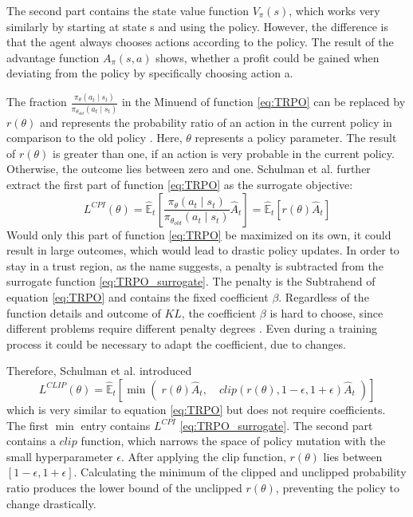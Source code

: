 The second part contains the state value function $V_\pi(s)$, which works very similarly by starting at state s and using the policy. However, the difference is that the agent always chooses actions according to the policy. The result of the advantage function $A_\pi(s,a)$ shows, whether a profit could be gained when deviating from the policy by specifically choosing action a.

The fraction $\frac{\pi_{\theta}(a_{t} \mid s_{t})}{\pi_{\theta_{old}}(a_{t} \mid s_{t})}$ in the Minuend of function \eqref{eq:TRPO} can be replaced by $r(\theta)$
and represents the probability ratio of an action in the current policy in comparison to the old policy \cite{scwo17}. Here, $\theta$ represents a policy parameter. The result of $r(\theta)$ is greater than one, if an action is very probable in the current policy. Otherwise, the outcome lies between zero and one. Schulman et al. \cite{scwo17} further extract the first part of function \eqref{eq:TRPO} as the surrogate objective:
\begin{equation}\label{eq:TRPO_surrogate}
    L^{CPI}(\theta) = \hat{\mathbb{E}}_{t} \left[ \frac{\pi_{\theta}(a_{t} \mid s_{t})}{\pi_{\theta_{old}}(a_{t} \mid s_{t})} \hat{A}_{t} \right]
    = \hat{\mathbb{E}}_{t} \left[ r(\theta)\hat{A}_{t} \right]
\end{equation}
Would only this part of function \eqref{eq:TRPO} be maximized on its own, it could result in large outcomes, which would lead to drastic policy updates. In order to stay in a trust region, as the name suggests, a penalty is subtracted from the surrogate function \eqref{eq:TRPO_surrogate}. The penalty is the Subtrahend of equation \eqref{eq:TRPO} and contains the fixed coefficient $\beta$. Regardless of the function details and outcome of $KL$, the coefficient $\beta$ is hard to choose, since different problems require different penalty degrees \cite{scwo17}. Even during a training process it could be necessary to adapt the coefficient, due to changes.

Therefore, Schulman et al. introduced
\begin{equation}\label{eq:PPO}
    L^{CLIP}(\theta) = \hat{\mathbb{E}}_{t} \left[ \min \left( \; r(\theta)\hat{A}_{t}, \quad clip(r(\theta), 1-\epsilon, 1+\epsilon)\hat{A}_{t} \; \right) \right]
\end{equation}
which is very similar to equation \eqref{eq:TRPO} but does not require coefficients. The first $\min$ entry contains $L^{CPI}$ \eqref{eq:TRPO_surrogate}. The second part contains a $clip$ function, which narrows the space of policy mutation with the small hyperparameter $\epsilon$. After applying the clip function, $r(\theta)$ lies between $[1-\epsilon,1+\epsilon]$. Calculating the minimum of the clipped and unclipped probability ratio produces the lower bound of the unclipped $r(\theta)$, preventing the policy to change drastically.

